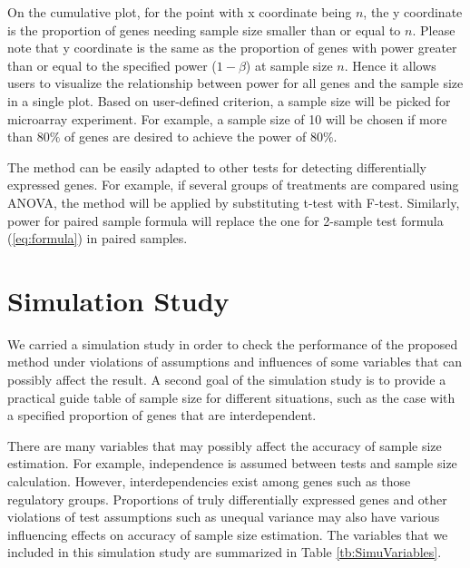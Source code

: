 \documentclass{bioinfo}
\begin{document}
On the cumulative plot, for the point with x coordinate being $n$,
the y coordinate is the proportion of genes needing sample size
smaller than or equal to $n$. Please note that y coordinate is the
same as the proportion of genes with power greater than or equal
to the specified power ($1- \beta$) at sample size $n$. Hence it
allows users to visualize the relationship between power for all
genes and the sample size in a single plot. Based on user-defined
criterion, a sample size will be picked for microarray experiment.
For example, a sample size of 10 will be chosen if more than
$80\%$ of genes are desired to achieve the power of $80\%$.

The method can be easily adapted to other tests for detecting
differentially expressed genes. For example, if several groups of
treatments are compared using ANOVA, the method will be applied by
substituting t-test  with F-test. Similarly, power for paired
sample formula will replace the one for 2-sample test formula
(\ref{eq:formula}) in paired samples.


\section{Simulation Study}
We carried a simulation study in order to check the performance of the proposed method under violations of assumptions and
influences of some variables that can possibly affect the result. A second goal of the simulation study is to provide a
practical guide table of sample size for different situations, such as the case with a specified proportion of genes that are
interdependent.

There are many variables that may possibly affect the accuracy of
sample size estimation. For example, independence is assumed
between tests and sample size calculation. However,
interdependencies exist among genes such as those regulatory
groups. Proportions of truly differentially expressed genes and
other violations of test assumptions such as unequal variance may
also have various influencing effects on accuracy of sample size
estimation. The variables that we included in this simulation
study are summarized in Table \ref{tb:SimuVariables}.
\end{document}
